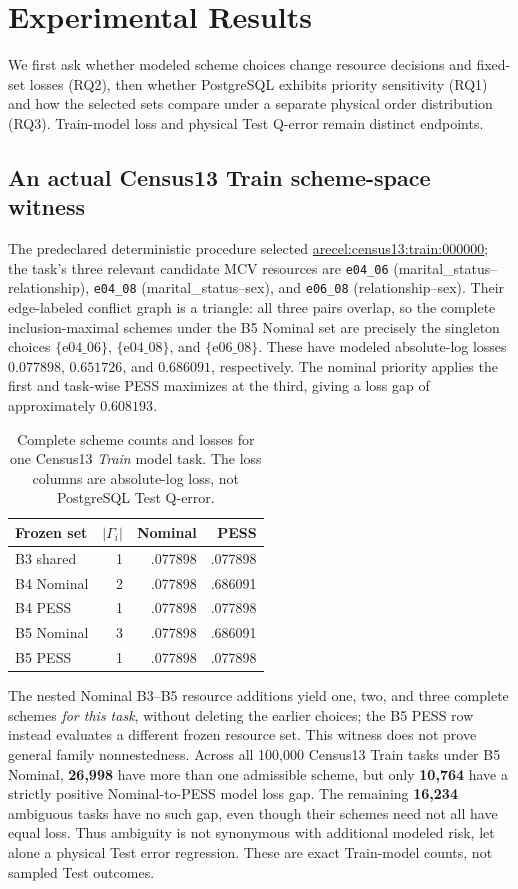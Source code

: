 \documentclass[sigconf, nonacm]{acmart}
\begin{document}
\section{Experimental Results}
\label{sec:results}
We first ask whether modeled scheme choices change
resource decisions and fixed-set losses (RQ2), then
whether PostgreSQL exhibits priority sensitivity (RQ1)
and how the selected sets compare under a separate
physical order distribution (RQ3). Train-model loss
and physical Test Q-error remain distinct endpoints.

\subsection{An actual Census13 Train scheme-space witness}
The predeclared deterministic procedure selected
\url{arecel:census13:train:000000}; the task's
three relevant candidate MCV resources are
\texttt{e04\_06} (marital\_\allowbreak{}status--relationship),
\texttt{e04\_08} (marital\_\allowbreak{}status--sex),
and \texttt{e06\_08} (relationship--sex).
Their edge-labeled conflict graph is a triangle:
all three pairs overlap, so the complete
inclusion-maximal schemes under the B5 Nominal
set are precisely the singleton choices
\(\{\mathrm{e04\_06}\}\), \(\{\mathrm{e04\_08}\}\), and
\(\{\mathrm{e06\_08}\}\).
These have modeled absolute-log losses
\(0.077898\), \(0.651726\), and \(0.686091\),
respectively. The nominal priority applies the first
and task-wise PESS maximizes at the third,
giving a loss gap of approximately \(0.608193\).

\begin{table}[t]
\caption{Complete scheme counts and losses for one
Census13 \emph{Train} model task. The loss columns are
absolute-log loss, not PostgreSQL Test Q-error.}
\label{tab:witness}
\centering\small
\begin{tabular}{@{}lrrr@{}}
\toprule
Frozen set & \(\lvert\Gamma_i\rvert\) &
Nominal & PESS\\
\midrule
B3 shared  & 1 & .077898 & .077898\\
B4 Nominal & 2 & .077898 & .686091\\
B4 PESS    & 1 & .077898 & .077898\\
B5 Nominal & 3 & .077898 & .686091\\
B5 PESS    & 1 & .077898 & .077898\\
\bottomrule
\end{tabular}
\end{table}

The nested Nominal B3--B5 resource additions yield
one, two, and three complete schemes \emph{for this task},
without deleting the earlier choices; the B5 PESS row
instead evaluates a different frozen resource set.
This witness does not prove general family nonnestedness.
Across all 100,000 Census13 Train tasks under B5 Nominal,
\textbf{26,998} have more than one admissible scheme,
but only \textbf{10,764} have a strictly positive
Nominal-to-PESS model loss gap. The remaining
\textbf{16,234} ambiguous tasks have no such gap,
even though their schemes need not all have equal loss.
Thus ambiguity is not synonymous with additional
modeled risk, let alone a physical Test error regression.
These are exact Train-model counts, not sampled Test outcomes.
\end{document}
